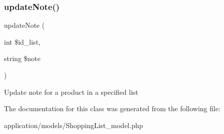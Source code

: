 \subsubsection{\texorpdfstring{update\+Note()}{updateNote()}}
{\footnotesize\ttfamily update\+Note (\begin{DoxyParamCaption}\item[{int}]{\$id\+\_\+list,  }\item[{string}]{\$note }\end{DoxyParamCaption})}

Update note for a product in a specified list 

The documentation for this class was generated from the following file\+:\begin{DoxyCompactItemize}
\item 
application/models/Shopping\+List\+\_\+model.\+php\end{DoxyCompactItemize}
